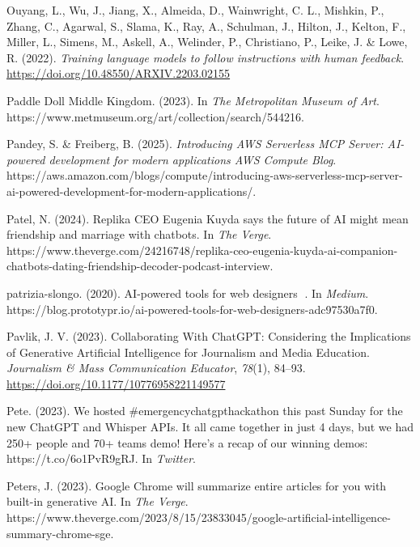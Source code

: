 \documentclass[
  letterpaper,
  DIV=11,
  numbers=noendperiod]{scrartcl}
\newlength{\cslhangindent}
\newenvironment{CSLReferences}[2] %
 {\begin{list}{}{%
  \setlength{\itemindent}{0pt}
  \setlength{\leftmargin}{0pt}
  \setlength{\parsep}{0pt}
  \ifodd #1
   \setlength{\leftmargin}{\cslhangindent}
   \setlength{\itemindent}{-1\cslhangindent}
  \fi
  \setlength{\itemsep}{#2\baselineskip}}}
 {\end{list}}
\begin{document}
\begin{CSLReferences}{1}{0}
Ouyang, L., Wu, J., Jiang, X., Almeida, D., Wainwright, C. L., Mishkin,
P., Zhang, C., Agarwal, S., Slama, K., Ray, A., Schulman, J., Hilton,
J., Kelton, F., Miller, L., Simens, M., Askell, A., Welinder, P.,
Christiano, P., Leike, J. \& Lowe, R. (2022). \emph{Training language
models to follow instructions with human feedback}.
\url{https://doi.org/10.48550/ARXIV.2203.02155}

Paddle {Doll} {\textbar} {Middle Kingdom}. (2023). In \emph{The
Metropolitan Museum of Art}.
https://www.metmuseum.org/art/collection/search/544216.

Pandey, S. \& Freiberg, B. (2025). \emph{Introducing {AWS Serverless MCP
Server}: {AI-powered} development for modern applications {\textbar}
{AWS Compute Blog}}.
https://aws.amazon.com/blogs/compute/introducing-aws-serverless-mcp-server-ai-powered-development-for-modern-applications/.

Patel, N. (2024). Replika {CEO Eugenia Kuyda} says the future of {AI}
might mean friendship and marriage with chatbots. In \emph{The Verge}.
https://www.theverge.com/24216748/replika-ceo-eugenia-kuyda-ai-companion-chatbots-dating-friendship-decoder-podcast-interview.

patrizia-slongo. (2020). {AI-powered} tools for web designers 🤖. In
\emph{Medium}.
https://blog.prototypr.io/ai-powered-tools-for-web-designers-adc97530a7f0.

Pavlik, J. V. (2023). Collaborating {With ChatGPT}: {Considering} the
{Implications} of {Generative Artificial Intelligence} for {Journalism}
and {Media Education}. \emph{Journalism \& Mass Communication Educator},
\emph{78}(1), 84--93. \url{https://doi.org/10.1177/10776958221149577}

Pete. (2023). We hosted \#emergencychatgpthackathon this past {Sunday}
for the new {ChatGPT} and {Whisper APIs}. {It} all came together in just
4 days, but we had 250+ people and 70+ teams demo! {Here}'s a recap of
our winning demos: {https://t.co/6o1PvR9gRJ}. In \emph{Twitter}.

Peters, J. (2023). Google {Chrome} will summarize entire articles for
you with built-in generative {AI}. In \emph{The Verge}.
https://www.theverge.com/2023/8/15/23833045/google-artificial-intelligence-summary-chrome-sge.


\end{CSLReferences}
\end{document}
